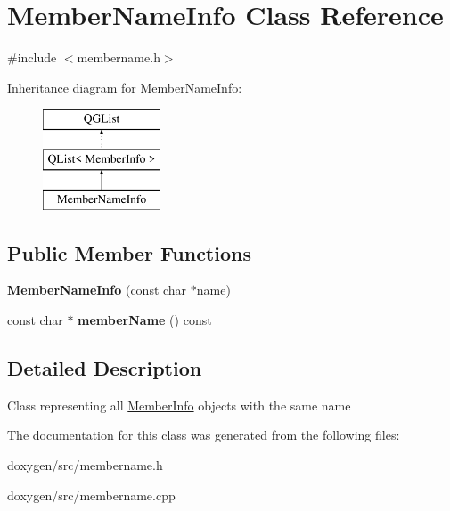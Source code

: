 \hypertarget{class_member_name_info}{}\section{Member\+Name\+Info Class Reference}
\label{class_member_name_info}


{\ttfamily \#include $<$membername.\+h$>$}

Inheritance diagram for Member\+Name\+Info\+:\begin{figure}[H]
\begin{center}
\leavevmode
\includegraphics[height=3.000000cm]{class_member_name_info}
\end{center}
\end{figure}
\subsection*{Public Member Functions}
\begin{DoxyCompactItemize}
\item 
\mbox{\label{class_member_name_info_a2594cc6542ad85f88eac5f43d8c99de0}} 
{\bfseries Member\+Name\+Info} (const char $\ast$name)
\item 
\mbox{\label{class_member_name_info_a3b1c1bb0818adb1f1aaba75102c864f4}} 
const char $\ast$ {\bfseries member\+Name} () const
\end{DoxyCompactItemize}


\subsection{Detailed Description}
Class representing all \mbox{\hyperlink{struct_member_info}{Member\+Info}} objects with the same name 

The documentation for this class was generated from the following files\+:\begin{DoxyCompactItemize}
\item 
doxygen/src/membername.\+h\item 
doxygen/src/membername.\+cpp\end{DoxyCompactItemize}

